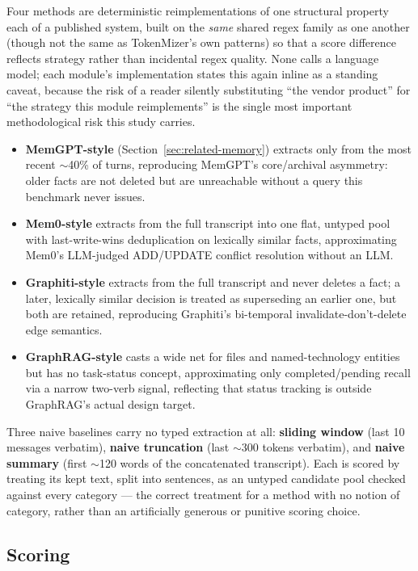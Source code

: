 \documentclass[journal]{IEEEtran}
\begin{document}
Four methods are deterministic reimplementations of one
structural property each of a published system, built on the
\emph{same} shared regex family as one another (though not the
same as TokenMizer's own patterns) so that a score difference
reflects strategy rather than incidental regex quality. None
calls a language model; each module's implementation states
this again inline as a standing caveat, because the risk of a
reader silently substituting ``the vendor product'' for ``the
strategy this module reimplements'' is the single most
important methodological risk this study carries.

\begin{itemize}
\item \textbf{MemGPT-style}
  (Section~\ref{sec:related-memory})
  \label{sec:memgpt-style}
  extracts only from the most recent $\sim$40\% of turns,
  reproducing MemGPT's core/archival asymmetry: older facts
  are not deleted but are unreachable without a query this
  benchmark never issues.
\item \textbf{Mem0-style} extracts from the full transcript
  into one flat, untyped pool with last-write-wins
  deduplication on lexically similar facts, approximating
  Mem0's LLM-judged ADD/UPDATE conflict resolution without an
  LLM.
\item \textbf{Graphiti-style} extracts from the full transcript
  and never deletes a fact; a later, lexically similar decision
  is treated as superseding an earlier one, but both are
  retained, reproducing Graphiti's bi-temporal
  invalidate-don't-delete edge semantics.
\item \textbf{GraphRAG-style} casts a wide net for files and
  named-technology entities but has no task-status concept,
  approximating only completed/pending recall via a narrow
  two-verb signal, reflecting that status tracking is outside
  GraphRAG's actual design target.
\end{itemize}

Three naive baselines carry no typed extraction at all:
\textbf{sliding window} (last 10 messages verbatim),
\textbf{naive truncation} (last $\sim$300 tokens verbatim), and
\textbf{naive summary} (first $\sim$120 words of the
concatenated transcript). Each is scored by treating its kept
text, split into sentences, as an untyped candidate pool
checked against every category --- the correct treatment for a
method with no notion of category, rather than an
artificially generous or punitive scoring choice.

\subsection{Scoring}
\label{sec:extended-scoring}
\end{document}
